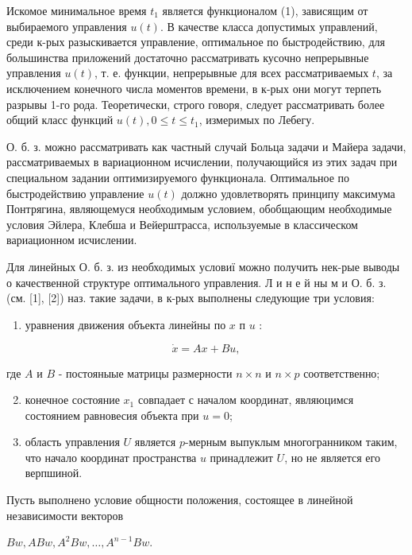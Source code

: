 \documentclass[10pt]{article}
\begin{document}
Искомое минимальное время $t_{1}$ является функционалом (1), зависящим от выбираемого управления $u(t)$. В качестве класса допустимых управлений, среди к-рых разыскивается управление, оптимальное по быстродействию, для большинства приложений достаточно рассматривать кусочно непрерывные управления $u(t)$, т. е. функции, непрерывные для всех рассматриваемых $t$, за исключением конечного числа моментов времени, в к-рых они могут терпеть разрывы 1-го рода. Теоретически, строго говоря, следует рассматривать более общий класс функций $u(t), 0 \leqslant t \leqslant t_{1}$, измеримых по Лебегу.



О. б. з. можно рассматривать как частный случай Больца задачи и Майера задачи, рассматриваемых в вариационном исчислении, получающийся из этих задач при специальном задании оптимизируемого функционала. Оптимальное по быстродействию управление $u(t)$ должно удовлетворять принципу максимума Понтрягина, являющемуся необходимым условием, обобщающим необходимые условия Эйлера, Клебша и Вейерштрасса, используемые в классическом вариационном исчислении.



Для линейных О. б. з. из необходимых условиї можно получить нек-рые выводы $о$ качественной структуре оптимального управления. Л и н е й ны м и О. б. з. (см. [1], [2]) наз. такие задачи, в к-рых выполнены следующие три условия:



\begin{enumerate}

  \item уравнения движения объекта линейны по $x$ п $u$ :

\end{enumerate}



\[

\dot{x}=A x+B u,

\]



где $A$ и $B$ - постояныые матрицы размерности $n \times n$ и $n \times p$ соответственно;



\begin{enumerate}

  \setcounter{enumi}{1}

  \item конечное состояние $x_{1}$ совпадает с началом координат, являюцимся состоянием равновесия объекта при $u=0$;



  \item область управления $U$ является $p$-мерным выпуклым многогранником таким, что начало координат пространства $u$ принадлежит $U$, но не является его верпшиной.



\end{enumerate}



Пусть выполнено условие общности положения, состоящее в линейной независимости векторов



$B w, A B w, A^{2} B w, \ldots, A^{n-1} B w$.
\end{document}
